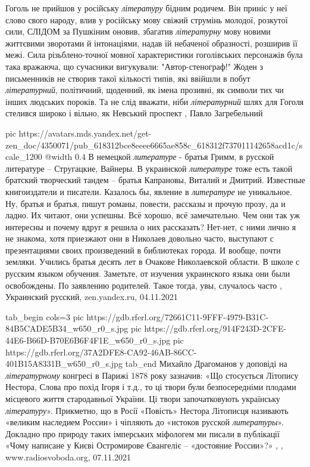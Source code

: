 Гоголь не прийшов у російську \emph{літературу} бідним родичем. Він приніс у
неї слово свого народу, влив у російську мову свіжий струмінь молодої, розкутої
сили, СЛІДОМ за Пушкіним оновив, збагатив \emph{літературну} мову новими
життєвими зворотами й інтонаціями, надав їй небаченої образності, розширив її
межі. Сила різьблено-точної мовної характеристики гоголівських персонажів була
така вражаюча, що сучасники вигукували: "Автор-стенограф!" Жоден з письменників
не створив такої кількості типів, які ввійшли в побут \emph{літературний},
політичний, щоденний, як імена прозивні, як символи тих чи інших людських
пороків.  Та не слід вважати, ніби \emph{літературний} шлях для Гоголя стелився
широко і вільно, як Невський проспект
, Павло Загребельний

\ifcmt
  pic https://avatars.mds.yandex.net/get-zen_doc/4350071/pub_618312bce8eeee6665ae858c_618312f737011142658acd1c/scale_1200
  @width 0.4
\fi
В немецкой \emph{литературе} - братья Гримм, в русской литературе – Стругацкие,
Вайнеры. В украинской \emph{литературе} тоже есть такой братский творческий
тандем – братья Капрановы, Виталий и Дмитрий. Известные книгоиздатели и
писатели.  Казалось бы, явление в \emph{литературе} не уникальное. Ну, братья и
братья, пишут романы, повести, рассказы и прочую прозу, да и ладно. Их читают,
они успешны. Всё хорошо, всё замечательно.  Чем они так уж интересны и почему
вдруг я решила о них рассказать? Нет-нет, с ними лично я не знакома, хотя
приезжают они в Николаев довольно часто, выступают с презентациями своих
произведений в библиотеках города. И вообще, почти земляки. Учились братья
десять лет в Очакове Николаевской области. В школе с русским языком обучения.
Заметьте, от изучения украинского языка они были освобождены. По заявлению
родителей. Такое тогда, увы, случалось часто
, Украинский русский, zen.yandex.ru, 04.11.2021


\ifcmt
  tab_begin cols=3
     pic https://gdb.rferl.org/72661C11-9FFF-4979-B31C-84B5CADE5B34_w650_r0_s.jpg
		 pic https://gdb.rferl.org/914F243D-2CFE-44E6-B66D-B70E6B6F4F1E_w650_r0_s.jpg
     pic https://gdb.rferl.org/37A2DFE8-CA92-46AB-86CC-401B15A8331B_w650_r0_s.jpg
  tab_end
\fi
Михайло Драгоманов у доповіді на \emph{літературному} конгресі в Парижі 1878 року
зазначив: «Що стосується Літопису Нестора, Слова про похід Ігоря і т.д., то ці
твори були безпосередніми плодами місцевого життя стародавньої України. Ці
твори започатковують українську \emph{літературу}».
Прикметно, що в Росії «Повість» Нестора Літописця називають «великим наследием
России» і чіпляють до «истоков русской \emph{литературы}». Докладно про природу таких
імперських міфологем ми писали в публікації «Чому написане у Києві Остромирове
Євангеліє – «достояние России»?»
, 
, www.radiosvoboda.org, 07.11.2021
